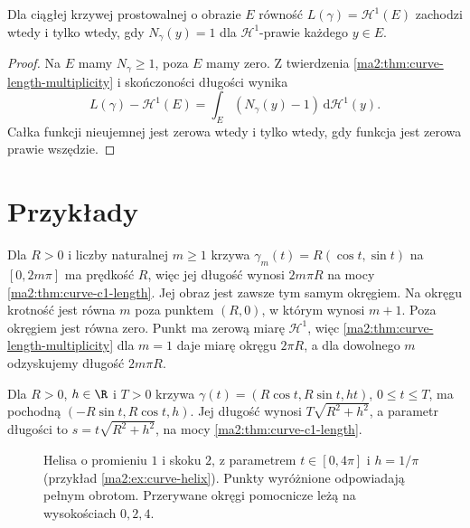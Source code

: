 \begin{wniosek}
\label{ma2:cor:curve-length-image-equality}
Dla ciągłej krzywej prostowalnej o obrazie $E$
równość $L(\gamma)=\mathcal H^1(E)$ zachodzi
wtedy i tylko wtedy, gdy $N_\gamma(y)=1$
dla $\mathcal H^1$-prawie każdego $y\in E$.
\end{wniosek}
\begin{proof}
Na $E$ mamy $N_\gamma\ge1$, poza $E$ mamy zero.
Z twierdzenia \ref{ma2:thm:curve-length-multiplicity}
i skończoności długości wynika
\[
 L(\gamma)-\mathcal H^1(E)=
 \int_E (N_\gamma(y)-1)\,\mathrm d\mathcal H^1(y).
\]
Całka funkcji nieujemnej jest zerowa wtedy i tylko
wtedy, gdy funkcja jest zerowa prawie wszędzie.
\end{proof}

\section{Przykłady}

\begin{przyklad}
\label{ma2:ex:curve-circle-multiplicity}
Dla $R>0$ i liczby naturalnej $m\ge1$ krzywa
$\gamma_m(t)=R(\cos t,\sin t)$ na $[0,2m\pi]$
ma prędkość $R$, więc jej długość wynosi $2m\pi R$
na mocy \ref{ma2:thm:curve-c1-length}.
Jej obraz jest zawsze tym samym okręgiem.
Na okręgu krotność jest równa $m$ poza punktem
$(R,0)$, w którym wynosi $m+1$. Poza okręgiem
jest równa zero. Punkt ma zerową miarę
$\mathcal H^1$, więc \ref{ma2:thm:curve-length-multiplicity}
dla $m=1$ daje miarę okręgu $2\pi R$, a dla dowolnego
$m$ odzyskujemy długość $2m\pi R$.
\end{przyklad}

\begin{przyklad}[Helisa]
\label{ma2:ex:curve-helix}
Dla $R>0$, $h\in\R$ i $T>0$ krzywa
$\gamma(t)=(R\cos t,R\sin t,ht)$, $0\le t\le T$,
ma pochodną $(-R\sin t,R\cos t,h)$.
Jej długość wynosi $T\sqrt{R^2+h^2}$,
a parametr długości to $s=t\sqrt{R^2+h^2}$,
na mocy \ref{ma2:thm:curve-c1-length}.
\end{przyklad}

\begin{figure}[htbp]
\centering
{}
\caption{Helisa o promieniu $1$ i skoku $2$,
z parametrem $t\in[0,4\pi]$ i $h=1/\pi$
(przykład \ref{ma2:ex:curve-helix}).
Punkty wyróżnione odpowiadają pełnym obrotom.
Przerywane okręgi pomocnicze leżą na wysokościach $0,2,4$.}
\label{ma2:fig:curve-helix}
\end{figure}

